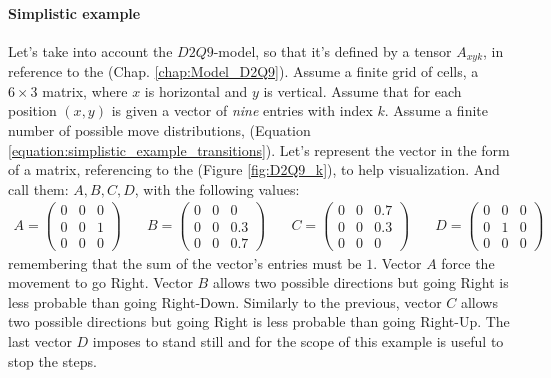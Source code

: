\documentclass[class=article, crop=false]{standalone}
\begin{document}
\paragraph{Simplistic example}
Let's take into account the $D2Q9$-model, so that it's defined by a tensor $A_{x y k}$, in reference to the (Chap. \ref{chap:Model_D2Q9}).
Assume a finite grid of cells, a $6\times3$ matrix, where $x$ is horizontal and $y$ is vertical.
Assume that for each position $(x, y)$ is given a vector of \emph{nine} entries with index $k$.
Assume a finite number of possible move distributions, (Equation \ref{equation:simplistic_example_transitions}).
Let's represent the vector in the form of a matrix, referencing to the (Figure \ref{fig:D2Q9_k}), to help visualization.
And call them: $A, B, C, D$, with the following values:
\begin{equation}
\begin{split}
A=
\left(
\begin{array}{ccc}
 0 &  0 & 0  \\
 0 &  0 & 1  \\
 0 &  0 & 0  
\end{array}
\right)
\end{split}\quad
\begin{split}
B=
\left(
\begin{array}{ccc}
 0 &  0 & 0  \\
 0 &  0 & 0.3  \\
 0 &  0 & 0.7  
\end{array}
\right)
\end{split}\quad
\begin{split}
C=
\left(
\begin{array}{ccc}
 0 &  0 & 0.7  \\
 0 &  0 & 0.3  \\
 0 &  0 & 0  
\end{array}
\right)
\end{split}\quad
\begin{split}
D=
\left(
\begin{array}{ccc}
 0 &  0 & 0  \\
 0 &  1 & 0  \\
 0 &  0 & 0  
\end{array}
\right)
\end{split}
\label{equation:simplistic_example_transitions}
\end{equation}
remembering that the sum of the vector's entries must be $1$.
Vector $A$ force the movement to go Right.
Vector $B$ allows two possible directions but going Right is less probable than going Right-Down.
Similarly to the previous, vector $C$ allows two possible directions but going Right is less probable than going Right-Up.
The last vector $D$ imposes to stand still and for the scope of this example is useful to stop the steps.
\end{document}
